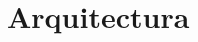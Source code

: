 %
%
%
%
%
%
%
%
%
%

\chapter{Arquitectura}
\label{cap4}
\label{cap:arquitectura}


\begin{FraseCelebre}
\begin{Frase}
\end{Frase}
\begin{Fuente}
\end{Fuente}
\end{FraseCelebre}

\begin{resumen}

\end{resumen}

